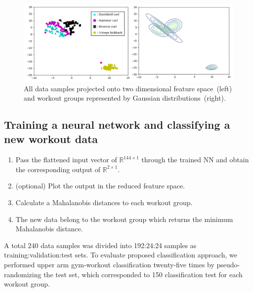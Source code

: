 \documentclass{ISIS}
\begin{document}
\begin{figure}[!b]
	\begin{center}
		\includegraphics[width=0.9\linewidth]{Figure1}
		\caption{All data samples projected onto two dimensional feature space~(left)\\ and workout groups represented by Gaussian distributions~(right).}\label{fig:tSNE_gauss}
	\end{center}
	\vskip -1pc
\end{figure}

\subsection{Training a neural network and classifying a new workout data}
{ \color{black}{ If the t-SNE is needed to be performed for every newly given data sample, then the entire workout classification process would be severely down-speeded. Therefore, given the flattened input vectors and the t-SNE outputs, we trained a NN to functionally approximate the t-SNE, which in turn serves as a surrogate system for the t-SNE. After training the NN, workout classification could be processed for an upcoming flattened input vectors as follows: } }

\begin{enumerate}
	\item Pass the flattened input vector of $\mathbb{R}^{144 \times 1}$ through the trained NN and obtain the corresponding output of $\mathbb{R}^{2 \times 1}$.
	\item (optional) Plot the output in the reduced feature space.
	\item Calculate a Mahalanobis distances to each workout group.
	\item The new data belong to the workout group which returns the minimum Mahalanobis distance.
\end{enumerate} 

A total 240 data samples was divided into 192:24:24 samples as training:validation:test sets. To evaluate proposed classification approach, we performed upper arm gym-workout classification twenty-five times by pseudo-randomizing the test set, which corresponded to 150 classification test for each workout group.   
\end{document}
